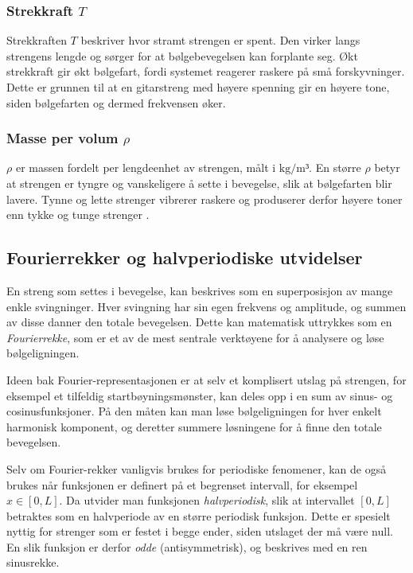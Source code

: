 \subsubsection{Strekkraft \texorpdfstring{$T$}{T}}
Strekkraften $T$ beskriver hvor stramt strengen er spent. 
Den virker langs strengens lengde og sørger for at bølgebevegelsen kan forplante seg. 
Økt strekkraft gir økt bølgefart, fordi systemet reagerer raskere på små forskyvninger. 
Dette er grunnen til at en gitarstreng med høyere spenning gir en høyere tone, siden bølgefarten og dermed frekvensen øker. 
\parencite{NTNUBolgelikning}

\subsubsection{Masse per volum \texorpdfstring{$\rho$}{rho}}
$\rho$ er massen fordelt per lengdeenhet av strengen, målt i $\text{kg/m³}$. 
En større $\rho$ betyr at strengen er tyngre og vanskeligere å sette i bevegelse, slik at bølgefarten blir lavere. 
Tynne og lette strenger vibrerer raskere og produserer derfor høyere toner enn tykke og tunge strenger \parencite{UCFStringLinearDensity}.

\subsection{Fourierrekker og halvperiodiske utvidelser}

En streng som settes i bevegelse, kan beskrives som en superposisjon av mange enkle svingninger.  
Hver svingning har sin egen frekvens og amplitude, og summen av disse danner den totale bevegelsen.  
Dette kan matematisk uttrykkes som en \textit{Fourierrekke}, som er et av de mest sentrale verktøyene for å analysere og løse bølgeligningen.  
\clearpage

Ideen bak Fourier-representasjonen er at selv et komplisert utslag på strengen, for eksempel et tilfeldig startbøyningsmønster, kan deles opp i en sum av sinus- og cosinusfunksjoner.  
På den måten kan man løse bølgeligningen for hver enkelt harmonisk komponent, og deretter summere løsningene for å finne den totale bevegelsen.  

Selv om Fourier-rekker vanligvis brukes for periodiske fenomener, kan de også brukes når funksjonen er definert på et begrenset intervall, for eksempel $x \in [0,L]$.  
Da utvider man funksjonen \textit{halvperiodisk}, slik at intervallet $[0,L]$ betraktes som en halvperiode av en større periodisk funksjon.  
Dette er spesielt nyttig for strenger som er festet i begge ender, siden utslaget der må være null.  
En slik funksjon er derfor \textit{odde} (antisymmetrisk), og beskrives med en ren sinusrekke. \parencite{intmathHalfRange} 

